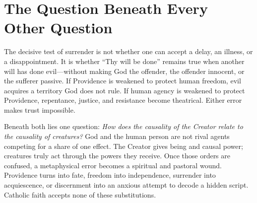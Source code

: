 \section{The Question Beneath Every Other Question}

The decisive test of surrender is not whether one can accept a delay, an
illness, or a disappointment. It is whether ``Thy will be done'' remains true
when another will has done evil---without making God the offender, the offender
innocent, or the sufferer passive. If Providence is weakened to protect human
freedom, evil acquires a territory God does not rule. If human agency is
weakened to protect Providence, repentance, justice, and resistance become
theatrical. Either error makes trust impossible.

Beneath both lies one question: \emph{How does the causality of the Creator
relate to the causality of creatures?} God and the human person are not rival
agents competing for a share of one effect. The Creator gives being and causal
power; creatures truly act through the powers they receive. Once those orders
are confused, a metaphysical error becomes a spiritual and pastoral wound.
Providence turns into fate, freedom into independence, surrender into
acquiescence, or discernment into an anxious attempt to decode a hidden script.
Catholic faith accepts none of these substitutions.


